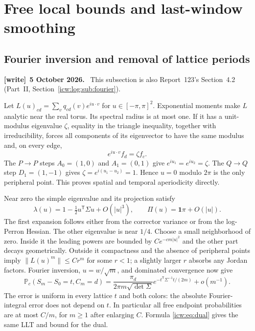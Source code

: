 \documentclass[11pt,letterpaper]{article}
\theoremstyle{remark}\newtheorem{remark}[theorem]{Remark}
\newcommand{\Prob}{\mathbb P}
\newcommand{\1}{\mathbf1}
\newenvironment{writenote}[1][]{\par\smallskip\begingroup\small
 \noindent\textbf{[write]}\if\relax\detokenize{#1}\relax\else~\textbf{#1.}\fi\ }%
 {\par\endgroup\smallskip}
\begin{document}
\section{Free local bounds and last-window smoothing}\label{icw:sec:smoothing}
\subsection{Fourier inversion and removal of lattice periods}\label{icw:sub:fourier}
\begin{writenote}[5 October 2026]
This subsection is also Report~123's Section~4.2 (Part~II, Section~\ref{icw:log:sub:fourier}).
\end{writenote}
Let
$L(u)_{cd}=\sum_vq_{cd}(v)e^{iu\cdot v}$ for
$u\in[-\pi,\pi]^2$. Exponential moments make $L$ analytic near the
real torus. Its spectral radius is at most one. If it has a unit-modulus
eigenvalue $\zeta$, equality in the triangle inequality, together with
irreducibility, forces all components of its eigenvector to have the
same modulus and, on every edge,
\[
 e^{iu\cdot v}f_d=\zeta f_c.
\]
The $P\to P$ steps $A_0=(1,0)$ and $A_1=(0,1)$ give
$e^{iu_1}=e^{iu_2}=\zeta$. The $Q\to Q$ step $D_1=(1,-1)$ gives
$\zeta=e^{i(u_1-u_2)}=1$. Hence $u=0$ modulo $2\pi$ is the only
peripheral point. This proves spatial and temporal aperiodicity directly.

Near zero the simple eigenvalue and its projection satisfy
\[
 \lambda(u)=1-\tfrac12u^{\mathsf T}\Sigma u+O(|u|^3),\qquad
 \Pi(u)=\1\pi+O(|u|).
\]
The first expansion follows either from the corrector variance or from
the log-Perron Hessian. The other eigenvalue is near $1/4$.
Choose a small neighborhood of zero. Inside it the leading powers are
bounded by $Ce^{-cm|u|^2}$ and the other part decays geometrically.
Outside it compactness and the absence of peripheral points imply
$\|L(u)^m\|\le Cr^m$ for some $r<1$; a slightly larger $r$ absorbs any
Jordan factors. Fourier inversion, $u=w/\sqrt m$, and dominated
convergence now give
\begin{equation}\label{icw:eq:LLT}
 \Prob_c(S_m-S_0=t,C_m=d)=
 \frac{\pi_d}{2\pi m\sqrt{\det\Sigma}}
  e^{-t^{\mathsf T}\Sigma^{-1}t/(2m)}+o(m^{-1}).
\end{equation}
The error is uniform in every lattice $t$ and both colors: the absolute
Fourier-integral error does not depend on $t$. In particular all free
endpoint probabilities are at most $C/m$, for $m\ge1$ after enlarging
$C$. Formula \eqref{icw:eq:dual} gives the same LLT and bound for the dual.
\end{document}
